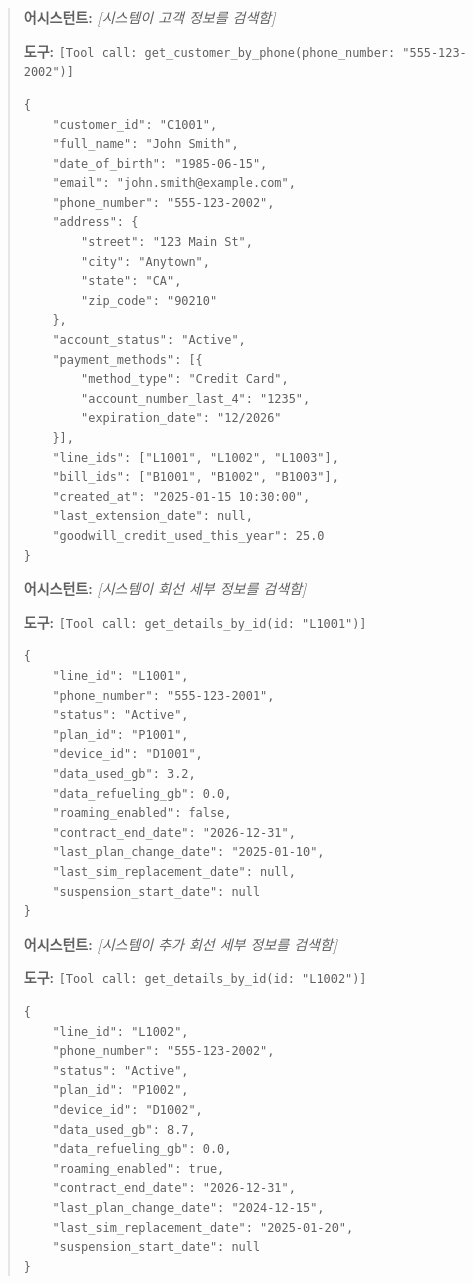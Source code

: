 \begin{quote}
\noindent\textbf{어시스턴트:} \textit{[시스템이 고객 정보를 검색함]}

\vspace{0.5em}
\noindent\textbf{도구:} \texttt{[Tool call: get\_customer\_by\_phone(phone\_number: "555-123-2002")]}

\begin{verbatim}
{
    "customer_id": "C1001",
    "full_name": "John Smith",
    "date_of_birth": "1985-06-15",
    "email": "john.smith@example.com",
    "phone_number": "555-123-2002",
    "address": {
        "street": "123 Main St",
        "city": "Anytown",
        "state": "CA",
        "zip_code": "90210"
    },
    "account_status": "Active",
    "payment_methods": [{
        "method_type": "Credit Card",
        "account_number_last_4": "1235",
        "expiration_date": "12/2026"
    }],
    "line_ids": ["L1001", "L1002", "L1003"],
    "bill_ids": ["B1001", "B1002", "B1003"],
    "created_at": "2025-01-15 10:30:00",
    "last_extension_date": null,
    "goodwill_credit_used_this_year": 25.0
}
\end{verbatim}

\vspace{0.5em}
\noindent\textbf{어시스턴트:} \textit{[시스템이 회선 세부 정보를 검색함]}

\vspace{0.5em}
\noindent\textbf{도구:} \texttt{[Tool call: get\_details\_by\_id(id: "L1001")]}

\begin{verbatim}
{
    "line_id": "L1001",
    "phone_number": "555-123-2001",
    "status": "Active",
    "plan_id": "P1001",
    "device_id": "D1001",
    "data_used_gb": 3.2,
    "data_refueling_gb": 0.0,
    "roaming_enabled": false,
    "contract_end_date": "2026-12-31",
    "last_plan_change_date": "2025-01-10",
    "last_sim_replacement_date": null,
    "suspension_start_date": null
}
\end{verbatim}

\vspace{0.5em}
\noindent\textbf{어시스턴트:} \textit{[시스템이 추가 회선 세부 정보를 검색함]}

\vspace{0.5em}
\noindent\textbf{도구:} \texttt{[Tool call: get\_details\_by\_id(id: "L1002")]}

\begin{verbatim}
{
    "line_id": "L1002",
    "phone_number": "555-123-2002",
    "status": "Active",
    "plan_id": "P1002",
    "device_id": "D1002",
    "data_used_gb": 8.7,
    "data_refueling_gb": 0.0,
    "roaming_enabled": true,
    "contract_end_date": "2026-12-31",
    "last_plan_change_date": "2024-12-15",
    "last_sim_replacement_date": "2025-01-20",
    "suspension_start_date": null
}
\end{verbatim}


\end{quote}
